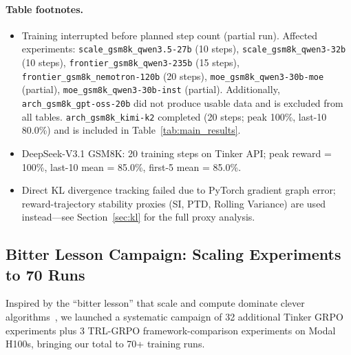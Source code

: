 \documentclass{article}
\begin{document}
\paragraph{Table footnotes.}
\begin{itemize}
    \item[$^\dagger$] Training interrupted before planned step count (partial run).
    Affected experiments:
    \texttt{scale\_gsm8k\_qwen3.5-27b} (10 steps), \texttt{scale\_gsm8k\_qwen3-32b} (10 steps),
    \texttt{frontier\_gsm8k\_qwen3-235b} (15 steps), \texttt{frontier\_gsm8k\_nemotron-120b} (20 steps),
    \texttt{moe\_gsm8k\_qwen3-30b-moe} (partial), \texttt{moe\_gsm8k\_qwen3-30b-inst} (partial).
    Additionally, \texttt{arch\_gsm8k\_gpt-oss-20b} did not produce usable data and is excluded
    from all tables. \texttt{arch\_gsm8k\_kimi-k2} completed (20 steps; peak 100\%, last-10 80.0\%)
    and is included in Table~\ref{tab:main_results}.
    \item[$^b$] DeepSeek-V3.1 GSM8K: 20 training steps on Tinker API;
    peak reward = 100\%, last-10 mean = 85.0\%, first-5 mean = 85.0\%.
    \item[$^h$] Direct KL divergence tracking failed due to PyTorch gradient graph error;
    reward-trajectory stability proxies (SI, PTD, Rolling Variance) are used
    instead---see Section~\ref{sec:kl} for the full proxy analysis.
\end{itemize}

\subsection{Bitter Lesson Campaign: Scaling Experiments to 70 Runs}
\label{sec:bitter_lesson}

Inspired by the ``bitter lesson'' that scale and compute dominate clever algorithms~\cite{schulman2017proximal}, we launched a systematic campaign of 32 additional Tinker GRPO experiments plus 3 TRL-GRPO framework-comparison experiments on Modal H100s, bringing our total to 70+ training runs.
\end{document}
